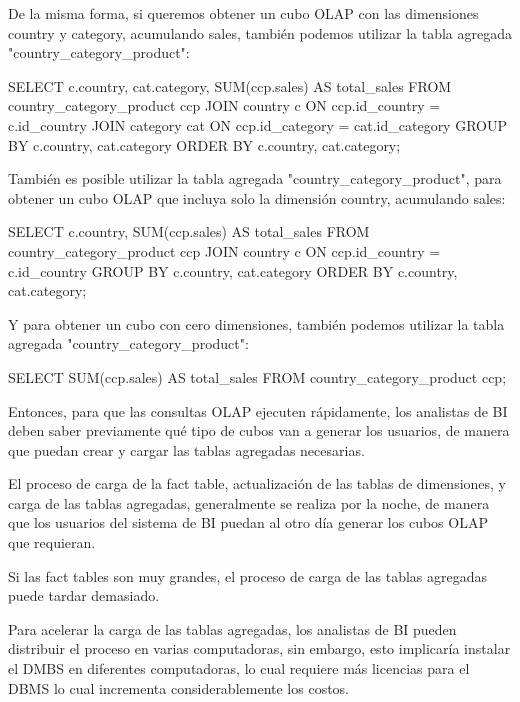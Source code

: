 De la misma forma, si queremos obtener un cubo OLAP con las dimensiones country y category, acumulando sales, también podemos utilizar la tabla agregada "country\_category\_product":

\begin{SourceCode}
SELECT c.country, cat.category, SUM(ccp.sales) AS total_sales
FROM country_category_product ccp
JOIN country c ON ccp.id_country = c.id_country
JOIN category cat ON ccp.id_category = cat.id_category
GROUP BY c.country, cat.category
ORDER BY c.country, cat.category;
\end{SourceCode}

También es posible utilizar la tabla agregada "country\_category\_product", para obtener un cubo OLAP que incluya solo la dimensión country, acumulando sales:

\begin{SourceCode}
SELECT c.country, SUM(ccp.sales) AS total_sales
FROM country_category_product ccp
JOIN country c ON ccp.id_country = c.id_country
GROUP BY c.country, cat.category
ORDER BY c.country, cat.category;
\end{SourceCode}

Y para obtener un cubo con cero dimensiones, también podemos utilizar la tabla agregada "country\_category\_product":

\begin{SourceCode}
SELECT SUM(ccp.sales) AS total_sales
FROM country_category_product ccp;
\end{SourceCode}

Entonces, para que las consultas OLAP ejecuten rápidamente, los analistas de BI deben saber previamente qué tipo de cubos van a generar los usuarios, de manera que puedan crear y cargar las tablas agregadas necesarias.

El proceso de carga de la fact table, actualización de las tablas de dimensiones, y carga de las tablas agregadas, generalmente se realiza por la noche, de manera que los usuarios del sistema de BI puedan al otro día generar los cubos OLAP que requieran.

Si las fact tables son muy grandes, el proceso de carga de las tablas agregadas puede tardar demasiado.

Para acelerar la carga de las tablas agregadas, los analistas de BI pueden distribuir el proceso en varias computadoras, sin embargo, esto implicaría instalar el DMBS en diferentes computadoras, lo cual requiere más licencias para el DBMS lo cual incrementa considerablemente los costos.

